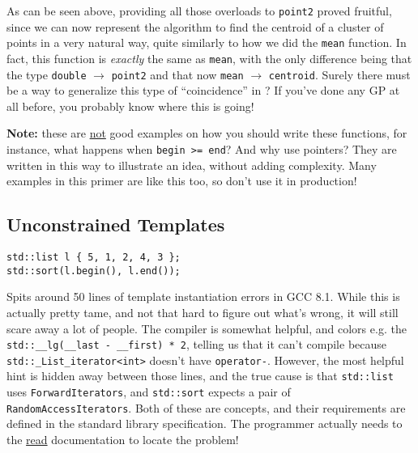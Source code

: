 



\noindent As can be seen above, providing all those overloads to \texttt{point2} proved fruitful, since we can now represent the algorithm to find the centroid of a cluster of points in a very natural way, quite similarly to how we did the \texttt{mean} function. In fact, this function is \emph{exactly} the same as \texttt{mean}, with the only difference being that the type \texttt{double} $\rightarrow$ \texttt{point2} and that now \texttt{mean} $\rightarrow$ \texttt{centroid}. Surely there must be a way to generalize this type of ``coincidence'' in \Cpp? If you've done any GP at all before, you probably know where this is going!

\vspace{1em}\noindent\textbf{Note:} these are \underline{not} good examples on how you should write these functions, for instance, what happens when \texttt{begin >= end}? And why use pointers? They are written in this way to illustrate an idea, without adding complexity. Many examples in this primer are like this too, so don't use it in production!

\subsection{Unconstrained Templates} \label{sec:unconstrained_templates}

    

    \newpage

    \begin{lstlisting}
std::list l { 5, 1, 2, 4, 3 };
std::sort(l.begin(), l.end()); \end{lstlisting}

\noindent Spits around 50 lines of template instantiation errors in GCC 8.1. While this is actually pretty tame, and not that hard to figure out what's wrong, it will still scare away a lot of people. The compiler is somewhat helpful, and colors e.g. the \texttt{std::\_\_lg(\_\_last - \_\_first) * 2}, telling us that it can't compile because \texttt{std::\_List\_iterator<int>} doesn't have \texttt{operator-}. However, the most helpful hint is hidden away between those lines, and the true cause is that \texttt{std::list} uses \texttt{ForwardIterators}, and \texttt{std::sort} expects a pair of \texttt{RandomAccessIterators}. Both of these are concepts, and their requirements are defined in the standard library specification. The programmer actually needs to the \underline{read} documentation to locate the problem!

